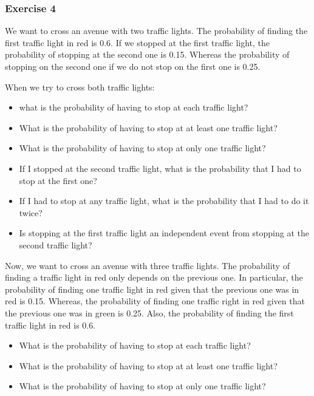 \documentclass[
]{book}
\providecommand{\tightlist}{%
  \setlength{\itemsep}{0pt}\setlength{\parskip}{0pt}}
\begin{document}
\hypertarget{exercise-4}{%
\subsubsection{Exercise 4}\label{exercise-4}}

We want to cross an avenue with two traffic lights. The probability of finding the first traffic light in red is 0.6. If we stopped at the first traffic light, the probability of stopping at the second one is 0.15. Whereas the probability of stopping on the second one if we do not stop on the first one is 0.25.

When we try to cross both traffic lights:

\begin{itemize}
\tightlist
\item
  what is the probability of having to stop at each traffic light?
\item
  What is the probability of having to stop at at least one traffic light?
\item
  What is the probability of having to stop at only one traffic light?
\item
  If I stopped at the second traffic light, what is the probability that I had to stop at the first one?\\
\item
  If I had to stop at any traffic light, what is the probability that I had to do it twice?
\item
  Is stopping at the first traffic light an independent event from stopping at the second traffic light?
\end{itemize}

Now, we want to cross an avenue with three traffic lights. The probability of finding a traffic light in red only depends on the previous one. In particular, the probability of finding one traffic light in red given that the previous one was in red is 0.15. Whereas, the probability of finding one traffic right in red given that the previous one was in green is 0.25. Also, the probability of finding the first traffic light in red is 0.6.

\begin{itemize}
\tightlist
\item
  What is the probability of having to stop at each traffic light?
\item
  What is the probability of having to stop at at least one traffic light?
\item
  What is the probability of having to stop at only one traffic light?
\end{itemize}
\end{document}
